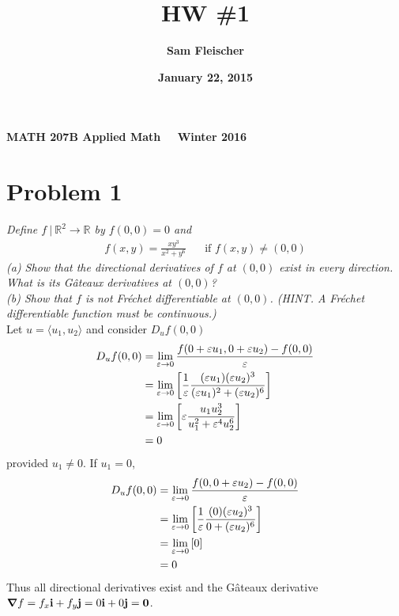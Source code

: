 \documentclass[12pt]{article}
\title{\bf HW \#1}
\author{\bf Sam Fleischer}
\date{\bf January 22, 2015}
\theoremstyle{plain}
\begin{document}
\textbf{MATH 207B \hfill Applied Math \ \ \hfill Winter 2016\ \ \ }

{\let\newpage\relax\maketitle}

\section*{Problem 1}
\textit{Define $f\ |\ \mathbb{R}^2 \rightarrow \mathbb{R}$ by $f(0, 0) = 0$ and}
\begin{align*}
    f(x,y) = \frac{xy^3}{x^2 + y^6}\ \ \ \ \ \ \text{ if } f(x,y) \neq (0,0)
\end{align*}
\textit{(a) Show that the directional derivatives of $f$ at $(0,0)$ exist in every direction.  What is its G\^{a}teaux derivatives at $(0, 0)$? \\
(b) Show that $f$ is not Fr\'{e}chet differentiable at $(0,0)$.  (HINT.  A Fr\'{e}chet differentiable function must be continuous.)} \\

Let $u = \langle u_1, u_2 \rangle$ and consider $D_u f(0, 0)$
\begin{align*}
    D_u f(0, 0) &= \lim_{\varepsilon \rightarrow 0}\frac{f(0 + \varepsilon u_1, 0 + \varepsilon u_2) - f(0, 0)}{\varepsilon} \\
    &= \lim_{\varepsilon \rightarrow 0} \qty[\frac{1}{\varepsilon} \frac{(\varepsilon u_1)(\varepsilon u_2)^3}{(\varepsilon u_1)^2 + (\varepsilon u_2)^6}] \\
    &= \lim_{\varepsilon \rightarrow 0} \qty[\varepsilon \frac{u_1 u_2^3}{u_1^2 + \varepsilon^4 u_2^6}] \\
    &= 0
\end{align*}
provided $u_1 \neq 0$.  If $u_1 = 0$,
\begin{align*}
    D_u f(0, 0) &= \lim_{\varepsilon \rightarrow 0}\frac{f(0, 0 + \varepsilon u_2) - f(0, 0)}{\varepsilon} \\
    &= \lim_{\varepsilon \rightarrow 0} \qty[\frac{1}{\varepsilon} \frac{(0)(\varepsilon u_2)^3}{0 + (\varepsilon u_2)^6}] \\
    &= \lim_{\varepsilon \rightarrow 0}\qty[0] \\
    &= 0
\end{align*}
Thus all directional derivatives exist and the G\^{a}teaux derivative $\grad f = f_x\textbf{i} + f_y\textbf{j} = 0\textbf{i} + 0\textbf{j} = \textbf{0}$.
\end{document}
